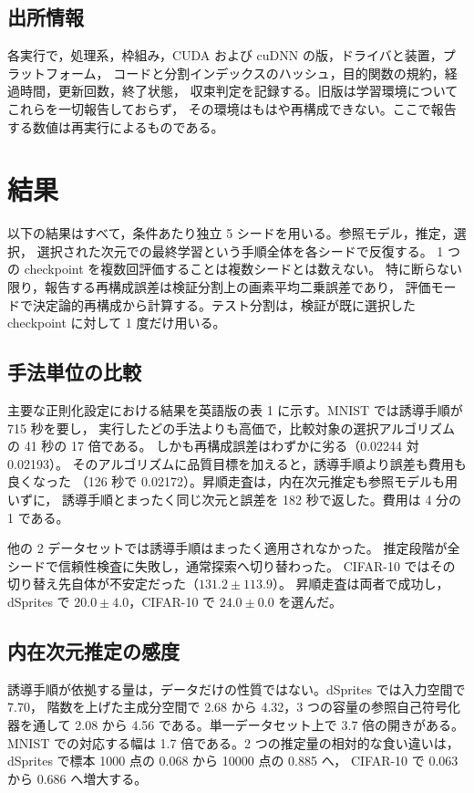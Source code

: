\documentclass[11pt,a4paper]{jsarticle}
\begin{document}
\subsection{出所情報}\label{sec:setup_prov}

各実行で，処理系，枠組み，CUDA および cuDNN の版，ドライバと装置，プラットフォーム，
コードと分割インデックスのハッシュ，目的関数の規約，経過時間，更新回数，終了状態，
収束判定を記録する。旧版は学習環境についてこれらを一切報告しておらず，
その環境はもはや再構成できない。ここで報告する数値は再実行によるものである。

\section{結果}\label{sec:results}

以下の結果はすべて，条件あたり独立 5 シードを用いる。参照モデル，推定，選択，
選択された次元での最終学習という手順全体を各シードで反復する。
1 つの checkpoint を複数回評価することは複数シードとは数えない。
特に断らない限り，報告する再構成誤差は検証分割上の画素平均二乗誤差であり，
評価モードで決定論的再構成から計算する。テスト分割は，検証が既に選択した
checkpoint に対して 1 度だけ用いる。

\subsection{手法単位の比較}\label{sec:res_methods}

主要な正則化設定における結果を英語版の表 1 に示す。MNIST では誘導手順が 715 秒を要し，
実行したどの手法よりも高価で，比較対象の選択アルゴリズムの 41 秒の 17 倍である。
しかも再構成誤差はわずかに劣る（0.02244 対 0.02193）。
そのアルゴリズムに品質目標を加えると，誘導手順より誤差も費用も良くなった
（126 秒で 0.02172）。昇順走査は，内在次元推定も参照モデルも用いずに，
誘導手順とまったく同じ次元と誤差を 182 秒で返した。費用は 4 分の 1 である。

他の 2 データセットでは誘導手順はまったく適用されなかった。
推定段階が全シードで信頼性検査に失敗し，通常探索へ切り替わった。
CIFAR-10 ではその切り替え先自体が不安定だった（$131.2 \pm 113.9$）。
昇順走査は両者で成功し，dSprites で $20.0 \pm 4.0$，CIFAR-10 で $24.0 \pm 0.0$ を選んだ。

\subsection{内在次元推定の感度}\label{sec:res_id}

誘導手順が依拠する量は，データだけの性質ではない。dSprites では入力空間で 7.70，
階数を上げた主成分空間で 2.68 から 4.32，3 つの容量の参照自己符号化器を通して
2.08 から 4.56 である。単一データセット上で 3.7 倍の開きがある。
MNIST での対応する幅は 1.7 倍である。2 つの推定量の相対的な食い違いは，
dSprites で標本 1000 点の 0.068 から 10000 点の 0.885 へ，
CIFAR-10 で 0.063 から 0.686 へ増大する。
\end{document}
